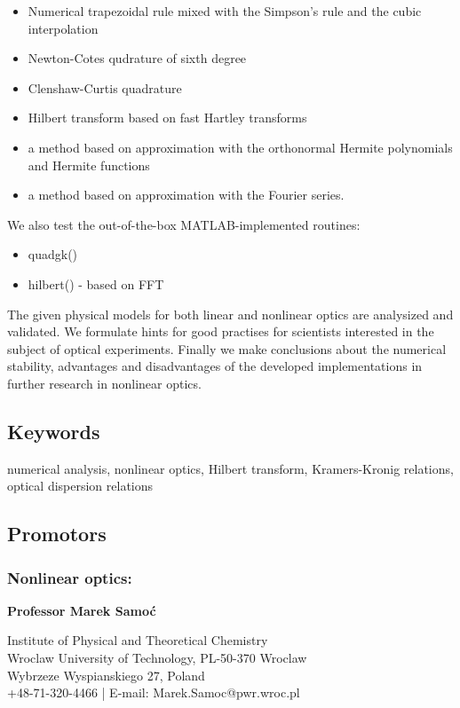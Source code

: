 \documentclass[12pt,twoside,a4paper]{article}
\def\emptyline{\vspace{12pt}}
\numberwithin{equation}{subsection}
\numberwithin{figure}{subsection}
\begin{document}
\begin{itemize} \label{used_methods}
 \item Numerical trapezoidal rule mixed with the Simpson's rule and the
cubic interpolation
 \item Newton-Cotes qudrature of sixth degree
 \item Clenshaw-Curtis quadrature
 \item Hilbert transform based on fast Hartley transforms
 \item a method based on approximation with the orthonormal Hermite polynomials and Hermite functions
 \item a method based on approximation with the Fourier series.
\end{itemize}

We also test the out-of-the-box MATLAB-implemented routines:

\begin{itemize} \label{matlab_methods}
  \item quadgk()
  \item hilbert() - based on FFT
\end{itemize}
The given physical models for both linear and nonlinear optics are analysized and validated. We formulate hints for good practises
for scientists interested in the subject of optical experiments. Finally we make conclusions about the numerical stability,
advantages and disadvantages of the developed implementations in further research in nonlinear optics.

\emptyline

\subsection*{Keywords} \label{chap:abstract_keywords}
numerical analysis, nonlinear optics, Hilbert transform, Kramers-Kronig relations, optical dispersion relations

\subsection*{Promotors} \label{chap:abstract_promotors}

\subsubsection*{Nonlinear optics:}

\textbf{Professor Marek Samoć}

Institute of Physical and Theoretical Chemistry \\
Wroclaw University of Technology, PL-50-370 Wroclaw \\
Wybrzeze Wyspianskiego 27, Poland \\
+48-71-320-4466 | E-mail: Marek.Samoc@pwr.wroc.pl
\end{document}
